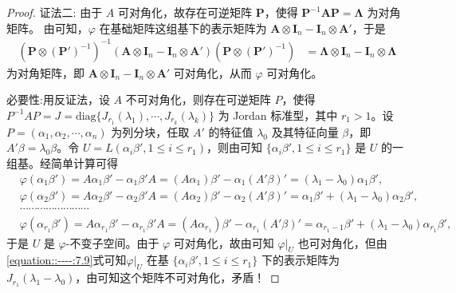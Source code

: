 \documentclass[../../main.tex]{subfiles}%
\begin{document}
\begin{proof}
{\color{blue}证法二:}
由于 $A$ 可对角化，故存在可逆矩阵 $\boldsymbol{P}$，使得 $\boldsymbol{P}^{-1}\boldsymbol{AP} = \boldsymbol{\Lambda}$ 为对角矩阵。
由可知，$\varphi$ 在基础矩阵这组基下的表示矩阵为 $\boldsymbol{A} \otimes \boldsymbol{I}_n - \boldsymbol{I}_n \otimes \boldsymbol{A}'$，于是
\begin{align*}
(\boldsymbol{P} \otimes (\boldsymbol{P}')^{-1})^{-1}(\boldsymbol{A} \otimes \boldsymbol{I}_n - \boldsymbol{I}_n \otimes \boldsymbol{A}')(\boldsymbol{P} \otimes (\boldsymbol{P}')^{-1}) 
&= \boldsymbol{\Lambda} \otimes \boldsymbol{I}_n - \boldsymbol{I}_n \otimes \boldsymbol{\Lambda}
\end{align*}
为对角矩阵，即 $\boldsymbol{A} \otimes \boldsymbol{I}_n - \boldsymbol{I}_n \otimes \boldsymbol{A}'$ 可对角化，从而 $\varphi$ 可对角化。

{\heiti 必要性:}用反证法，设 $A$ 不可对角化，则存在可逆矩阵 $P$，使得 $P^{-1}AP = J = \mathrm{diag}\{J_{r_1}(\lambda_1),\cdots,J_{r_k}(\lambda_k)\}$ 为 Jordan 标准型，其中 $r_1 > 1$。设 $P = (\alpha_1,\alpha_2,\cdots,\alpha_n)$ 为列分块，任取 $A'$ 的特征值 $\lambda_0$ 及其特征向量 $\beta$，即 $A'\beta = \lambda_0\beta$。令 $U = L(\alpha_i\beta',1\leqslant  i\leqslant  r_1)$，则由可知 $\{\alpha_i\beta',1\leqslant  i\leqslant  r_1\}$ 是 $U$ 的一组基。经简单计算可得
\begin{align}\label{equation::----:7.9}
&\varphi (\alpha _1\beta ' )=A\alpha _1\beta ' -\alpha _1\beta ' A=\left( A\alpha _1 \right) \beta ' -\alpha _1\left( A' \beta \right) ' =(\lambda _1-\lambda _0)\alpha _1\beta ' ,
\nonumber \\
&\varphi (\alpha _2\beta ' )=A\alpha _2\beta ' -\alpha _2\beta ' A=\left( A\alpha _2 \right) \beta ' -\alpha _2\left( A' \beta \right) ' =\alpha _1\beta ' +(\lambda _1-\lambda _0)\alpha _2\beta ' ,
\nonumber \\
&\cdots \cdots \cdots \cdots \cdots \cdots \cdots \cdots 
\nonumber \\
&\varphi (\alpha _{r_1}\beta ' )=A\alpha _{r_1}\beta ' -\alpha _{r_1}\beta ' A=\left( A\alpha _{r_1} \right) \beta ' -\alpha _{r_1}\left( A' \beta \right) ' =\alpha _{r_1-1}\beta ' +(\lambda _1-\lambda _0)\alpha _{r_1}\beta ' ,
\end{align}
于是 $U$ 是 $\varphi$-不变子空间。由于 $\varphi$ 可对角化，故由可知 $\varphi|_U$ 也可对角化，但由\eqref{equation::----:7.9}式可知$\varphi|_U$ 在基 $\{\alpha_i\beta',1\leqslant  i\leqslant  r_1\}$ 下的表示矩阵为 $J_{r_1}(\lambda_1 - \lambda_0)$，由可知这个矩阵不可对角化，矛盾！

\end{proof}
\end{document}
